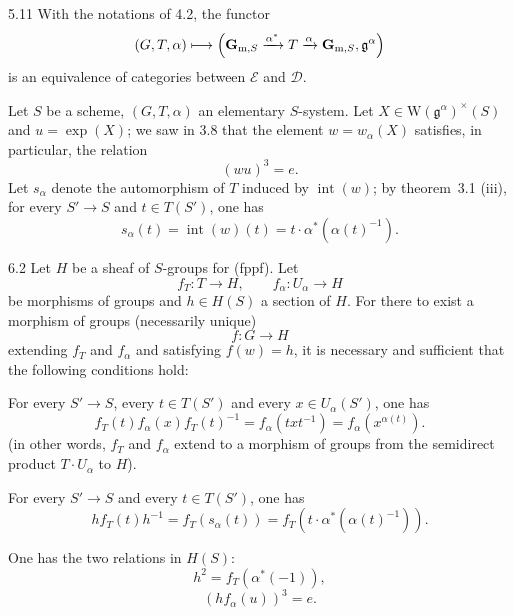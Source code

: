 \begin{theorem}{5.11}\label{XX.5.11}
With the notations of 4.2, the functor
\[
(G,T,\alpha)\longmapsto\left(\mathbf G_{\mathrm m,S}\xrightarrow{\alpha^*}T\xrightarrow\alpha\mathbf G_{\mathrm m,S},\mathfrak g^\alpha\right)
\]
is an equivalence of categories between $\mathcal E$ and $\mathcal D$.
\end{theorem}

\label{XX.sec.6}
 Let $S$ be a scheme, $(G,T,\alpha)$ an elementary $S$-system. Let $X\in\mathrm W(\mathfrak g^\alpha)^\times(S)$ and $u=\exp(X)$; we saw in 3.8 that the element $w=w_\alpha(X)$ satisfies, in particular, the relation
\[
(wu)^3=e.
\]
{\renewcommand{\thefootnote}{(36)}}%
Let $s_\alpha$ denote the automorphism of $T$ induced by $\operatorname{int}(w)$; by theorem~3.1 (iii), for every $S'\to S$ and $t\in T(S')$, one has
\[
s_\alpha(t)=\operatorname{int}(w)(t)=t\cdot\alpha^*(\alpha(t)^{-1}).
\]

\begin{theorem}{6.2}\label{XX.6.2}
Let $H$ be a sheaf of $S$-groups for (fppf). Let
\[
f_T:T\to H,\qquad f_\alpha:U_\alpha\to H
\]
be morphisms of groups and $h\in H(S)$ a section of $H$. For there to exist a morphism of groups (necessarily unique)
\[
f:G\to H
\]
extending $f_T$ and $f_\alpha$ and satisfying $f(w)=h$, it is necessary and sufficient that the following conditions hold:
\begin{enumeratei}
\item For every $S'\to S$, every $t\in T(S')$ and every $x\in U_\alpha(S')$, one has
\begin{equation}\tag{1}\label{XX.6.eq.1}
f_T(t)f_\alpha(x)f_T(t)^{-1}=f_\alpha(txt^{-1})=f_\alpha(x^{\alpha(t)}).
\end{equation}
(in other words, $f_T$ and $f_\alpha$ extend to a morphism of groups from the semidirect product $T\cdot U_\alpha$ to $H$).
\item For every $S'\to S$ and every $t\in T(S')$, one has
\begin{equation}\tag{2}\label{XX.6.eq.2}
hf_T(t)h^{-1}=f_T(s_\alpha(t))=f_T(t\cdot\alpha^*(\alpha(t)^{-1})).
\end{equation}
\item One has the two relations in $H(S)$:
\begin{equation}\tag{3}\label{XX.6.eq.3}
h^2=f_T(\alpha^*(-1)),
\end{equation}
\begin{equation}\tag{4}\label{XX.6.eq.4}
(hf_\alpha(u))^3=e.
\end{equation}
\end{enumeratei}
\end{theorem}
